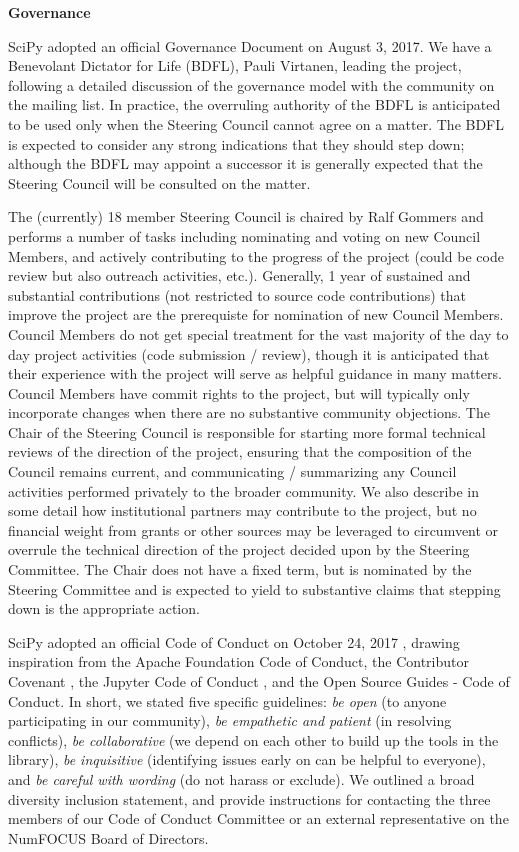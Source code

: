 \documentclass[fleqn,10pt]{wlscirep}
\begin{document}
\textbf{Governance}

SciPy adopted an official Governance Document on August 3,
2017\cite{SciPyProjectGovernance}.
We have a Benevolant Dictator for Life (BDFL), Pauli Virtanen, leading the
project, following a detailed discussion of the governance model with the
community on the mailing list.  In practice, the overruling authority of the BDFL
is anticipated to be used only when the Steering Council cannot agree on a matter.
The BDFL is expected to consider any strong indications that they should step down;
although the BDFL may appoint a successor it is generally expected that the Steering
Council will be consulted on the matter.

The (currently) 18 member Steering Council is chaired by Ralf Gommers and performs a number of
tasks including nominating and voting on new Council Members, and actively
contributing to the progress of the project (could be code review but also
outreach activities, etc.). Generally, 1 year of sustained and substantial
contributions (not restricted to source code contributions) that improve
the project are the prerequiste for nomination of new Council Members. Council
Members do not get special treatment for the vast majority of the day to day
project activities (code submission / review), though it is anticipated that their
experience with the project will serve as helpful guidance in many matters.
Council Members have commit rights to the project, but will typically only
incorporate changes when there are no substantive community objections. The
Chair of the Steering Council is responsible for starting more formal
technical reviews of the direction of the project, ensuring that the
composition of the Council remains current, and communicating / summarizing
any Council activities performed privately to the broader community. We also
describe in some detail how institutional partners may contribute to the
project, but no financial weight from grants or other sources
may be leveraged to circumvent or overrule the technical direction of the
project decided upon by the Steering Committee. The Chair does not have
a fixed term, but is nominated by the Steering Committee and is expected
to yield to substantive claims that stepping down is the appropriate action.

SciPy adopted an official Code of Conduct on October 24, 2017
\cite{SciPyCodeOfConduct}, drawing
inspiration from the Apache Foundation Code of
Conduct\cite{ApacheCodeOfConduct}, the Contributor Covenant
\cite{ContributorConvenant},
the Jupyter Code of Conduct \cite{Jupyter_COC}, and the Open Source Guides -
Code of Conduct\cite{OSG_COC}. In short,
we stated five specific guidelines: \emph{be open} (to anyone participating in our community),
\emph{be empathetic and patient} (in resolving conflicts), \emph{be collaborative} (we depend
on each other to build up the tools in the library), \emph{be inquisitive} (identifying issues
early on can be helpful to everyone), and \emph{be careful with wording} (do not harass or exclude).
We outlined a broad diversity inclusion statement, and provide
instructions for contacting the three members of our Code of Conduct Committee or an
external representative on the NumFOCUS Board of Directors.
\end{document}
